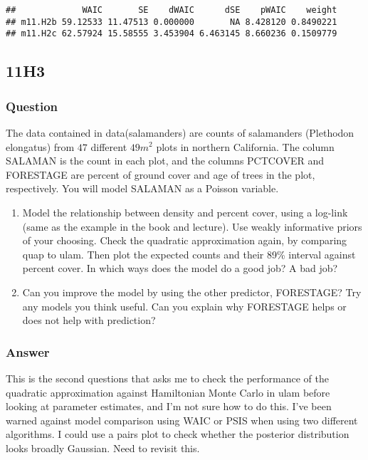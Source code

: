 \documentclass[
]{book}
\begin{document}
\begin{verbatim}
##             WAIC       SE    dWAIC      dSE    pWAIC    weight
## m11.H2b 59.12533 11.47513 0.000000       NA 8.428120 0.8490221
## m11.H2c 62.57924 15.58555 3.453904 6.463145 8.660236 0.1509779
\end{verbatim}

\hypertarget{h3-4}{%
\subsection*{11H3}\label{h3-4}}

\hypertarget{question-95}{%
\subsubsection*{Question}\label{question-95}}

The data contained in data(salamanders) are counts of salamanders (Plethodon elongatus) from \(47\) different \(49m^2\) plots in northern California. The column SALAMAN is the count in each plot, and the columns PCTCOVER and FORESTAGE are percent of ground cover and age of trees in the plot, respectively. You will model SALAMAN as a Poisson variable.

\begin{enumerate}
\def\labelenumi{(\alph{enumi})}
\item
  Model the relationship between density and percent cover, using a log-link (same as the example in the book and lecture). Use weakly informative priors of your choosing. Check the quadratic approximation again, by comparing quap to ulam. Then plot the expected counts and their 89\% interval against percent cover. In which ways does the model do a good job? A bad job?
\item
  Can you improve the model by using the other predictor, FORESTAGE? Try any models you think useful. Can you explain why FORESTAGE helps or does not help with prediction?
\end{enumerate}

\hypertarget{answer-95}{%
\subsubsection*{Answer}\label{answer-95}}

This is the second questions that asks me to check the performance of the quadratic approximation against Hamiltonian Monte Carlo in ulam before looking at parameter estimates, and I'm not sure how to do this. I've been warned against model comparison using WAIC or PSIS when using two different algorithms. I could use a pairs plot to check whether the posterior distribution looks broadly Gaussian. Need to revisit this.
\end{document}
